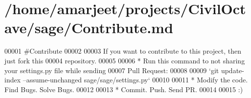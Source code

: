 \hypertarget{Contribute_8md_source}{}\section{/home/amarjeet/projects/\+Civil\+Octave/sage/\+Contribute.md}

\begin{DoxyCode}
00001 #Contribute
00002 
00003 If you want to contribute to this project, then just fork this
00004 repository.
00005 
00006 * Run this command to not sharing your settings.py file while sending
00007 Pull Request:
00008 
00009 `git update-index --assume-unchanged sage/sage/settings.py`
00010 
00011 * Modify the code. Find Bugs. Solve Bugs. 
00012 
00013 * Commit. Push. Send PR.
00014 
00015 :)
\end{DoxyCode}
